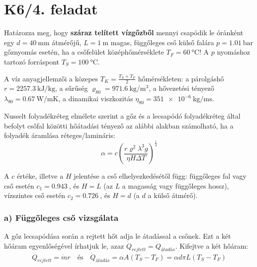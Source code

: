 

\section*{K6/4. feladat}
Határozza meg, hogy \textbf{száraz telített vízgőzből} mennyi csapódik le óránként egy $d = \SI{40}{\milli\meter}$ átmérőjű, $L = \SI{1}{\meter}$ magas, függőleges cső külső falára $p = \SI{1.01}{\bar}$ gőznyomás esetén, ha a csőfelület középhőmérséklete $T_F = \SI{60}{\celsius}$! A $p$ nyomáshoz tartozó forráspont $T_S = \SI{100}{\celsius}$.

A víz anyagjellemzői a közepes $T_K=\frac{T_S + T_F}{2}$ hőmérsékleten: a párolgáshő $r = \SI{2257.3}{\kilo\joule\per\kilogram}$, a sűrűség $\varrho_{80} = \SI{971.6}{\kilogram\per\meter\cubed}$, a hővezetési tényező $\lambda_{80} = \SI{0.67}{\watt\per\meter\kelvin}$, a dinamikai viszkozitás $\eta_{80} = \SI{351e-6}{\kilogram\per\meter\second}$.

\vspace{2mm}

Nusselt folyadékréteg elmélete szerint a gőz és a lecsapódó folyadékréteg által befolyt csőfal közötti hőátadási tényező az alábbi alakban számolható, ha a folyadék áramlása réteges/lamináris:
\vspace{-2mm}
\begin{equation}
	\alpha = c \left(\dfrac{r \varrho^2 \lambda^3 g}{\eta H \Delta T}\right)^{\tfrac{1}{4}}
\end{equation}

A $c$ értéke, illetve a $H$ jelentése a cső elhelyezkedésétől függ: függőleges fal vagy cső esetén $c_1 = \SI{0,943}{}$, és $H = L$ (az $L$ a magasság vagy függőleges hossz), vízszintes cső esetén $c_2 = \SI{0,726}{}$, és $H = d$ (a $d$ a külső átmérő).

\subsubsection*{a) Függőleges cső vizsgálata}
A gőz lecsapódása során a rejtett hőt adja le átadással a csőnek. Ezt a két hőáram egyenlőségével írhatjuk le, azaz $\dot{Q}_{\textit{rejtett}} = \dot{Q}_{\textit{átadás}}$. Kifejtve a két hőáram:
\begin{equation}
	\dot{Q}_{\textit{rejtett}} = \dot{m}r \quad \textrm{és} \quad \dot{Q}_{\textit{átadás}} = \alpha A \left(T_S - T_F\right) = \alpha d \pi L \left(T_S - T_F\right)
\end{equation}

